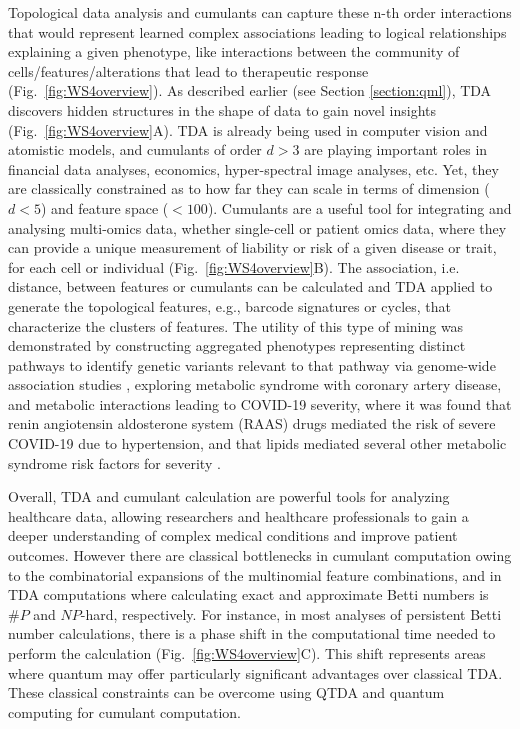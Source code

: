 \documentclass{article}
\begin{document}
Topological data analysis and cumulants can capture these n-th order interactions that would represent learned complex associations leading to logical relationships explaining a given phenotype, like interactions between the community of cells/features/alterations that lead to therapeutic response (Fig.~\ref{fig:WS4overview}). 
As described earlier (see Section \ref{section:qml}), TDA discovers hidden structures in the shape of data to gain novel insights (Fig.~\ref{fig:WS4overview}A).
TDA is already being used in computer vision and atomistic models, and cumulants of order $d > 3$ are playing important roles in financial data analyses, economics, hyper-spectral image analyses, etc. Yet, they are classically constrained as to how far they can scale in terms of dimension ($d <5 $) and feature space ($< 100$).
Cumulants are a useful tool for integrating and analysing multi-omics data, whether single-cell or patient omics data, where they can provide a unique measurement of liability or risk of a given disease or trait, for each cell or individual (Fig.~\ref{fig:WS4overview}B). The association, i.e. distance, between features or cumulants can be calculated and  TDA applied to generate the topological features, e.g., barcode signatures or cycles, that characterize the clusters of features. The utility of this type of mining was demonstrated by constructing aggregated phenotypes representing distinct pathways to identify genetic variants relevant to that pathway via genome-wide association studies \cite{platt_characterizing_2016}, exploring metabolic syndrome with coronary artery disease, and metabolic interactions leading to COVID-19 severity, where it was found that renin angiotensin aldosterone system (RAAS) drugs mediated the risk of severe COVID-19 due to hypertension, and that lipids mediated several other metabolic syndrome risk factors for severity \cite{platt_epidemiological_2022,karisani_topology_2022}.

Overall, TDA and cumulant calculation are powerful tools for analyzing healthcare data, allowing researchers and healthcare professionals to gain a deeper understanding of complex medical conditions and improve patient outcomes. However there are classical bottlenecks in cumulant computation owing to the combinatorial expansions of the multinomial feature combinations, and in TDA computations where calculating exact and approximate Betti numbers is $\#P$ and $NP$-hard\cite{schmidhuber2022complexitytheoretic}, respectively. For instance, in most analyses of persistent Betti number calculations, there is a phase shift in the computational time needed to perform the calculation (Fig.~\ref{fig:WS4overview}C). This shift represents areas where quantum may offer particularly significant advantages over classical TDA. These classical constraints can be overcome using QTDA and quantum computing for cumulant computation. 
\end{document}
